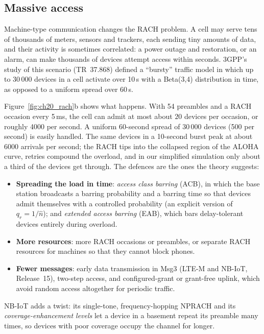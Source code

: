 \subsection{Massive access}

Machine-type communication changes the RACH problem. A cell may serve tens of thousands of meters, sensors and
trackers, each sending tiny amounts of data, and their activity is sometimes correlated: a power outage and
restoration, or an alarm, can make thousands of devices attempt access within seconds. 3GPP's study of this
scenario (TR~37.868) defined a ``bursty'' traffic model in which up to 30\,000 devices in a cell activate over
10\,s with a Beta(3,4) distribution in time, as opposed to a uniform spread over 60\,s.

Figure~\ref{fig:ch20_rach}b shows what happens. With 54 preambles and a RACH occasion every 5\,ms, the cell
can admit at most about $20$ devices per occasion, or roughly 4000 per second. A uniform 60-second spread of
30\,000 devices (500 per second) is easily handled. The same devices in a 10-second burst peak at about
6000 arrivals per second; the RACH tips into the collapsed region of the ALOHA curve, retries compound the
overload, and in our simplified simulation only about a third of the devices get through. The defences are
the ones the theory suggests:
\begin{itemize}
\item \textbf{Spreading the load in time}: \emph{access class barring} (ACB), in which the base station broadcasts
a barring probability and a barring time so that devices admit themselves with a controlled probability (an
explicit version of $q_r=1/\hat n$); and \emph{extended access barring} (EAB), which bars delay-tolerant devices
entirely during overload.
\item \textbf{More resources}: more RACH occasions or preambles, or separate RACH resources for machines so that
they cannot block phones.
\item \textbf{Fewer messages}: early data transmission in Msg3 (LTE-M and NB-IoT, Release~15), two-step access,
and configured-grant or grant-free uplink, which avoid random access altogether for periodic traffic.
\end{itemize}
NB-IoT adds a twist: its single-tone, frequency-hopping NPRACH and its \emph{coverage-enhancement levels} let a
device in a basement repeat its preamble many times, so devices with poor coverage occupy the channel for longer.


